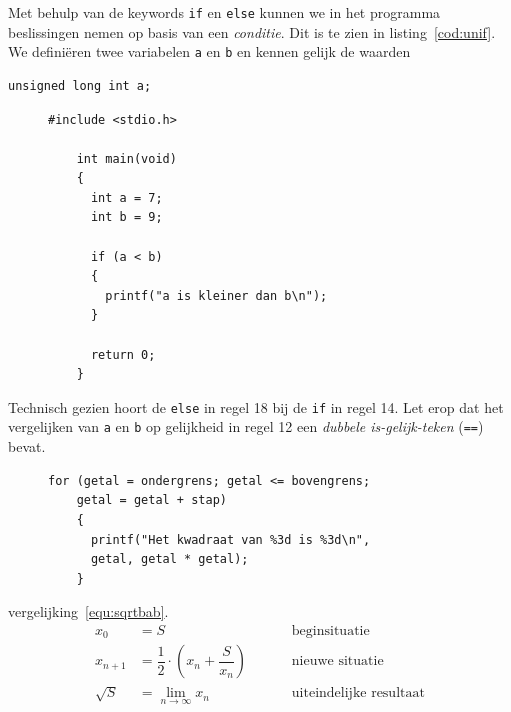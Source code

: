 \documentclass[12pt,a4paper,final,twoside,fleqn]{book}
\begin{document}
Met behulp van de keywords \texttt{if} en \texttt{else} kunnen we in het programma beslissingen nemen op basis van een \textsl{conditie}. Dit is te zien in listing~\ref{cod:unif}. We definiëren twee variabelen \texttt{a} en \texttt{b} en kennen gelijk de waarden
\begin{lstlisting}[style=lstoneline]
  unsigned long int a;
\end{lstlisting}

\begin{figure}[!b]
  \begin{lstlisting}[caption=Afdrukken van tekst op basis van een beslissing.,label=cod:unif]
    #include <stdio.h>

    int main(void)
    {
      int a = 7;
      int b = 9;

      if (a < b)
      {
        printf("a is kleiner dan b\n");
      }

      return 0;
    }
  \end{lstlisting}
\end{figure}


Technisch gezien hoort de \texttt{else} in regel 18 bij de \texttt{if} in regel 14. Let erop dat het vergelijken van \texttt{a} en \texttt{b} op gelijkheid in regel 12 een \textsl{dubbele is-gelijk-teken} (\texttt{==})\indexop{==} bevat.







\begin{figure}[!ht]
  \begin{lstlisting}[caption=Gebruik van een \texttt{for}-statement.,label=cod:unfor]
    for (getal = ondergrens; getal <= bovengrens;
    getal = getal + stap)
    {
      printf("Het kwadraat van %3d is %3d\n",
      getal, getal * getal);
    }
  \end{lstlisting}
\end{figure}

vergelijking~\eqref{equ:sqrtbab}.
%
\begin{equation}
  \label{equ:sqrtbab}
  \begin{split}
    x_0 &= S &&&& \text{beginsituatie} \\
    x_{n+1} &= \dfrac{1}{2}\cdot\left(x_n + \dfrac{S}{x_n}\right) &&&& \text{nieuwe situatie}\\
    \sqrt{S} &= \lim_{n\rightarrow\infty} x_n &&&& \text{uiteindelijke resultaat}
  \end{split}
\end{equation}
\end{document}

